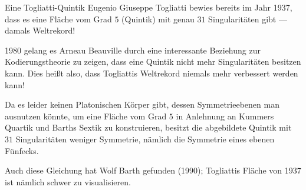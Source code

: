 \begin{surferPage}{Eine Togliatti-Quintik}
    Eugenio Giuseppe Togliatti bewies bereits im Jahr 1937,
    dass es eine Fläche vom Grad $5$ (Quintik) mit genau $31$ Singularitäten
    gibt --- damals Weltrekord!  

    1980 gelang es Arneau Beauville durch eine interessante Beziehung
    zur Kodierungstheorie zu zeigen, dass eine Quintik nicht
    mehr Singularitäten besitzen kann. 
    Dies heißt also, dass Togliattis Weltrekord niemals 
    mehr verbessert werden kann!

    Da es leider keinen Platonischen Körper gibt, dessen Symmetrieebenen man
    ausnutzen könnte, um eine Fläche vom Grad $5$ in Anlehnung an Kummers
    Quartik und Barths Sextik zu konstruieren, besitzt die abgebildete Quintik
    mit $31$ Singularitäten weniger Symmetrie, nämlich die Symmetrie eines
    ebenen Fünfecks.

    Auch diese Gleichung hat Wolf Barth gefunden (1990); Togliattis Fläche 
    von 1937 ist nämlich schwer zu visualisieren.
\end{surferPage}
